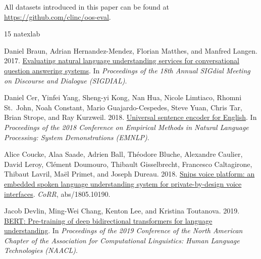 \documentclass[11pt,a4paper]{article}
\begin{document}
All datasets introduced in this paper can be found at \url{https://github.com/clinc/oos-eval}.


%

\begin{thebibliography}{15}
\expandafter\ifx\csname natexlab\endcsname\relax\def\natexlab#1{#1}\fi

Daniel Braun, Adrian Hernandez-Mendez, Florian Matthes, and Manfred Langen.
  2017.
\newblock \href {http://aclweb.org/anthology/W17-5522} {Evaluating natural
  language understanding services for conversational question answering
  systems}.
\newblock In \emph{Proceedings of the 18th Annual SIGdial Meeting on Discourse
  and Dialogue (SIGDIAL)}.

Daniel Cer, Yinfei Yang, Sheng-yi Kong, Nan Hua, Nicole Limtiaco, Rhomni
  St.~John, Noah Constant, Mario Guajardo-Cespedes, Steve Yuan, Chris Tar,
  Brian Strope, and Ray Kurzweil. 2018.
\newblock \href {http://aclweb.org/anthology/D18-2029} {Universal sentence
  encoder for {E}nglish}.
\newblock In \emph{Proceedings of the 2018 Conference on Empirical Methods in
  Natural Language Processing: System Demonstrations (EMNLP)}.

Alice Coucke, Alaa Saade, Adrien Ball, Th{\'{e}}odore Bluche, Alexandre
  Caulier, David Leroy, Cl{\'{e}}ment Doumouro, Thibault Gisselbrecht,
  Francesco Caltagirone, Thibaut Lavril, Ma{\"{e}}l Primet, and Joseph Dureau.
  2018.
\newblock \href {http://arxiv.org/abs/1805.10190} {Snips voice platform: an
  embedded spoken language understanding system for private-by-design voice
  interfaces}.
\newblock \emph{CoRR}, abs/1805.10190.

Jacob Devlin, Ming-Wei Chang, Kenton Lee, and Kristina Toutanova. 2019.
\newblock \href {https://www.aclweb.org/anthology/N19-1423} {{BERT}:
  Pre-training of deep bidirectional transformers for language understanding}.
\newblock In \emph{Proceedings of the 2019 Conference of the North American
  Chapter of the Association for Computational Linguistics: Human Language
  Technologies (NAACL)}.


\end{thebibliography}
\end{document}
